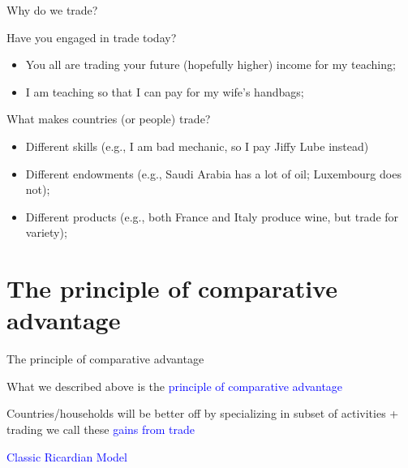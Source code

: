 \documentclass[notes,11pt, aspectratio=169, xcolor=table]{beamer}
\newcommand{\blue}[1]{\textcolor{blue}{#1}}
\newenvironment{wideitemize}{\itemize\addtolength{\itemsep}{10pt}}{\enditemize}
\begin{document}
\begin{frame}{Why do we trade?}
\begin{wideitemize}
    \item Have you engaged in trade today?
    \begin{itemize}
        \item You all are trading your future (hopefully higher) income for my teaching;
        \item I am teaching so that I can pay for my wife's handbags;
    \end{itemize}
    \item What makes countries (or people) trade?
    \vspace{12pt}

    \begin{itemize}
        \item Different skills (e.g., I am bad mechanic, so I pay Jiffy Lube instead)
        \item Different endowments (e.g., Saudi Arabia has a lot of oil; Luxembourg does not);
        \item Different products (e.g., both France and Italy produce wine, but trade for variety);
    \end{itemize}

\end{wideitemize}    
\end{frame}


\section{The principle of comparative advantage}

\begin{frame}{The principle of comparative advantage}
    \begin{wideitemize} 
        \item What we described above is the \textcolor{blue}{principle of comparative advantage}
        \item Countries/households will be better off by specializing in subset of activities + trading
    \end{wideitemize}
\vspace{24pt}
        \Huge
        \centering
        we call these \textcolor{blue}{gains from trade}
        \normalsize
\end{frame}

\begin{frame}
\addtocounter{framenumber}{-1}

\centering

\Huge{\blue{Classic Ricardian Model}}
    
\end{frame}
\end{document}
